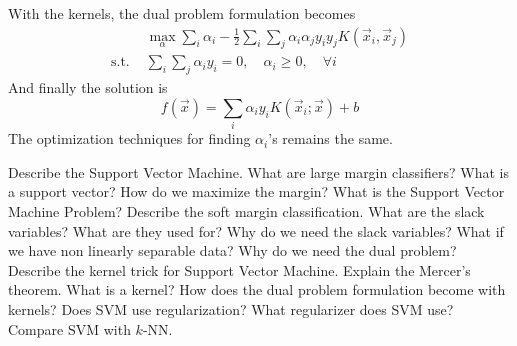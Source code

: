 With the kernels, the dual problem formulation becomes
\begin{align*}
    &\max_\alpha \sum_i \alpha_i - \frac 1 2 \sum_i \sum_j \alpha_i \alpha_j y_i y_j K(\vec{x}_i, \vec{x}_j)\\
    \text{s.t. } &\sum_i \sum_j \alpha_i y_i = 0, \quad \alpha_i \geq 0, \quad \forall i
\end{align*}
And finally the solution is
\begin{equation}
    f(\vec{x}) = \sum_i \alpha_i y_i K(\vec{x}_i; \vec{x}) + b
\end{equation}
The optimization techniques for finding \(\alpha_i\)'s remains the same.

\newpage
\begin{exercise}[topsep=20pt, itemsep=10pt]
    \ex[!] Describe the Support Vector Machine.
    \ex What are large margin classifiers?
    \ex What is a support vector?
    \ex How do we maximize the margin?
    \ex[!] What is the Support Vector Machine Problem?
    \ex Describe the soft margin classification.
    \ex What are the slack variables? What are they used for?
    \ex[!] Why do we need the slack variables?
    \ex What if we have non linearly separable data?
    \ex Why do we need the dual problem?
    \ex Describe the kernel trick for Support Vector Machine.
    \ex Explain the Mercer's theorem.
    \ex What is a kernel?
    \ex How does the dual problem formulation become with kernels?
    \ex[!] Does SVM use regularization? What regularizer does SVM use?
    \ex[!] Compare SVM with \(k\)-NN.
\end{exercise}
